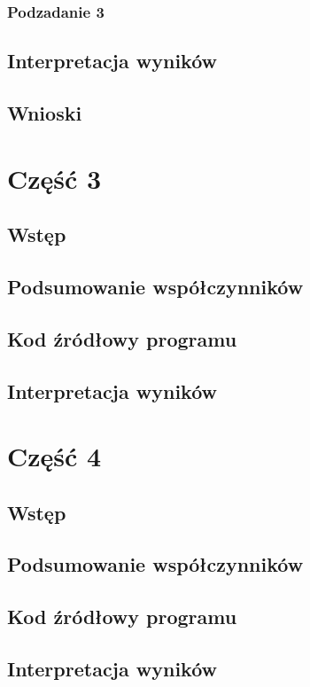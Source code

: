 \documentclass[
	12pt, %
]{fphw}
\begin{document}
\subsubsection{Podzadanie 3}


\subsection{Interpretacja wyników}
\subsection{Wnioski}
\section{Część 3}
\subsection{Wstęp}
\subsection{Podsumowanie współczynników}
\subsection{Kod źródłowy programu}
\subsection{Interpretacja wyników}
\section{Część 4}
\subsection{Wstęp}
\subsection{Podsumowanie współczynników}
\subsection{Kod źródłowy programu}
\subsection{Interpretacja wyników}
\end{document}
